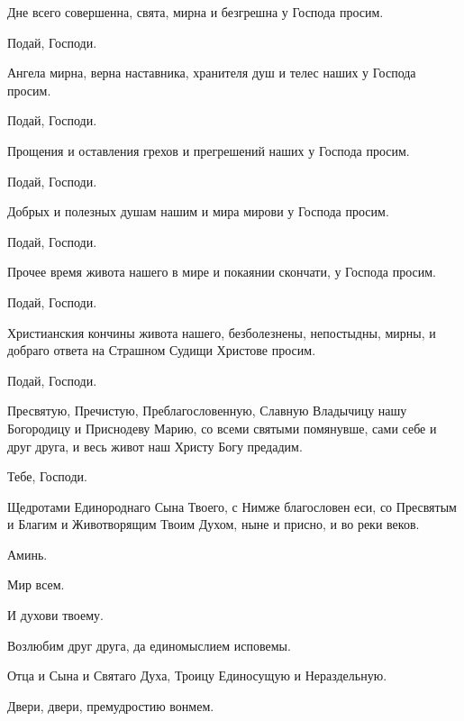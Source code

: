 \begin{mymulticols}
 Дне всего совершенна, свята, мирна и безгрешна у Господа просим. 

 Подай, Господи. 

 Ангела мирна, верна наставника, хранителя душ и телес наших у Господа просим. 

 Подай, Господи. 

 Прощения и оставления грехов и прегрешений наших у Господа просим. 

 Подай, Господи. 

 Добрых и полезных душам нашим и мира мирови у Господа просим. 

 Подай, Господи. 

 Прочее время живота нашего в мире и покаянии скончати, у Господа просим. 

 Подай, Господи. 

 Христианския кончины живота нашего, безболезнены, непостыдны, мирны, и добраго ответа на Страшном Судищи Христове просим. 

 Подай, Господи. 

 Пресвятую, Пречистую, Преблагословенную, Славную Владычицу нашу Богородицу и Приснодеву Марию, со всеми святыми помянувше, сами себе и друг друга, и весь живот наш Христу Богу предадим.

 Тебе, Господи.

 Щедротами Единороднаго Сына Твоего, с Нимже благословен еси, со Пресвятым и Благим и Животворящим Твоим Духом, ныне и присно, и во реки веков.

 Аминь.

 Мир всем.

 И духови твоему.

 Возлюбим друг друга, да единомыслием исповемы.

 Отца и Сына и Святаго Духа, Троицу Единосущую и Нераздельную.

 Двери, двери, премудростию вонмем. 




\begin{enumerate}


\end{enumerate}
\end{mymulticols}
